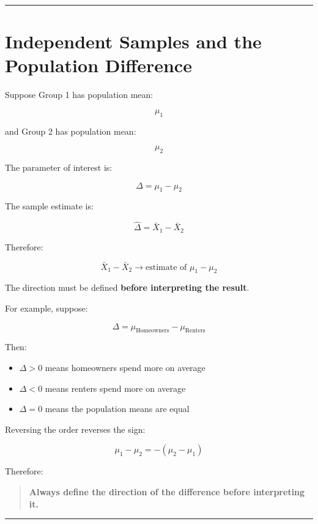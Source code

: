 \documentclass[
  letterpaper,
  DIV=11,
  numbers=noendperiod]{scrreprt}
\providecommand{\tightlist}{%
  \setlength{\itemsep}{0pt}\setlength{\parskip}{0pt}}
\begin{document}
\begin{center}\rule{0.5\linewidth}{0.5pt}\end{center}


\chapter{Independent Samples and the Population
Difference}\label{independent-samples-and-the-population-difference}

Suppose Group 1 has population mean:

\[
\mu_1
\]

and Group 2 has population mean:

\[
\mu_2
\]

The parameter of interest is:

\[
\boxed{\Delta=\mu_1-\mu_2}
\]

The sample estimate is:

\[
\boxed{\hat{\Delta}=\bar{X}_1-\bar{X}_2}
\]

Therefore:

\[
\bar{X}_1-\bar{X}_2
\rightarrow
\text{estimate of }
\mu_1-\mu_2
\]

The direction must be defined \textbf{before interpreting the result}.

For example, suppose:

\[
\Delta
=
\mu_{\text{Homeowners}}
-
\mu_{\text{Renters}}
\]

Then:

\begin{itemize}
\tightlist
\item
  \(\Delta>0\) means homeowners spend more on average
\item
  \(\Delta<0\) means renters spend more on average
\item
  \(\Delta=0\) means the population means are equal
\end{itemize}

Reversing the order reverses the sign:

\[
\mu_1-\mu_2
=
-(\mu_2-\mu_1)
\]

Therefore:

\begin{quote}
\textbf{Always define the direction of the difference before
interpreting it.}
\end{quote}

\begin{center}\rule{0.5\linewidth}{0.5pt}\end{center}
\end{document}
